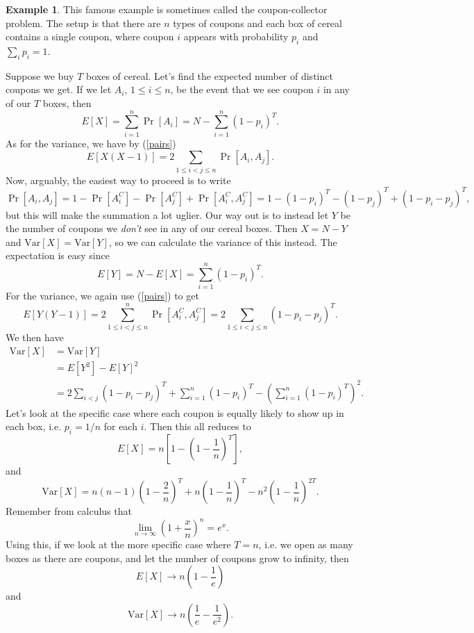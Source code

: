 \documentclass[12pt]{article}
\theoremstyle{plain}
\theoremstyle{definition}
\newtheorem{example}[theorem]{Example}
\theoremstyle{remark}
\newcommand{\Var}{\ensuremath{\textrm{Var}}}
\begin{document}
\begin{example}
    This famous example is sometimes called the coupon-collector problem.
    The setup is that there are $n$ types of coupons and each box of cereal contains a single coupon, where coupon $i$ appears with probability $p_i$ and $\sum_i p_i = 1$.

    Suppose we buy $T$ boxes of cereal.
    Let's find the expected number of distinct coupons we get.
    If we let $A_i$, $1\leq i \leq n$, be the event that we see coupon $i$ in any of our $T$ boxes, then
    \[
        E[X] = \sum_{i=1}^n \Pr[A_i] = N - \sum_{i=1}^n(1-p_i)^T.
    \]
    As for the variance, we have by (\ref{pairs})
    \[
        E[X(X-1)] = 2\sum_{1\leq i<j\leq n}\Pr[A_i,A_j].
    \]
    Now, arguably, the easiest way to proceed is to write
    \[
        \Pr[A_i, A_j] = 1-\Pr[A_i^C]-\Pr[A_j^C] + \Pr[A_i^C, A_j^C] = 1- (1-p_i)^T - (1-p_j)^T + (1-p_i-p_j)^T,
    \]
    but this will make the summation a lot uglier.
    Our way out is to instead let $Y$ be the number of coupons we \emph{don't} see in any of our cereal boxes.
    Then $X = N-Y$ and $\Var[X] = \Var[Y]$, so we can calculate the variance of this instead.
    The expectation is easy since
    \[
        E[Y] = N - E[X] = \sum_{i=1}^n(1-p_i)^T.
    \]
    For the variance, we again use (\ref{pairs}) to get
    \[
        E[Y(Y-1)]= 2\sum_{1\leq i<j\leq n}^n\Pr[A_i^C, A_j^C] = 2\sum_{1\leq i<j\leq n}(1-p_i-p_j)^T.
    \]
    We then have
    \begin{align*}
        \Var[X] &= \Var[Y]\\
        &= E[Y^2] - E[Y]^2\\
        &= 2\sum_{i<j}(1-p_i-p_j)^T+ \sum_{i=1}^n(1-p_i)^T - \left(\sum_{i=1}^n(1-p_i)^T\right)^2.
    \end{align*}
    Let's look at the specific case where each coupon is equally likely to show up in each box, i.e. $p_i= 1/n$ for each $i$.
    Then this all reduces to 
    \[
        E[X] = n\left[1- \left(1- \frac{1}{n}\right)^T\right],
    \]
    and
    \[
        \Var[X] = n(n-1)\left(1-\frac{2}{n}\right)^T + n\left(1-\frac{1}{n}\right)^T - n^2\left(1-\frac{1}{n}\right)^{2T}.
    \]
    Remember from calculus that
    \[
        \lim_{n\to \infty}\left(1 + \frac{x}{n}\right)^n = e^x.
    \]
    Using this, if we look at the more specific case where $T = n$, i.e. we open as many boxes as there are coupons, and let the number of coupons grow to infinity, then
    \[
        E[X]\to n\left(1 - \frac{1}{e}\right)
    \]
    and
    \[
        \Var[X] \to n\left(\frac{1}{e} - \frac{1}{e^2}\right).
    \]
\end{example}
\end{document}
